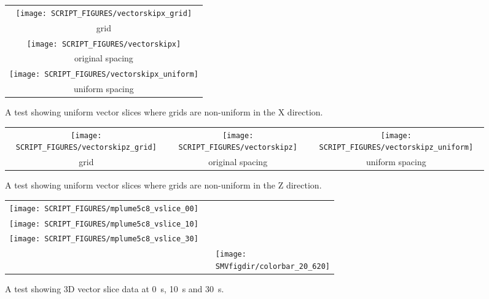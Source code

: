 \documentclass[11pt,twoside]{book}
\begin{document}
\begin{figure}[bph]
\begin{center}
\begin{tabular}{c}
 \texttt{[image: SCRIPT\_FIGURES/vectorskipx\_grid]}\\
 grid\\
 \texttt{[image: SCRIPT\_FIGURES/vectorskipx]}\\
 original spacing\\
 \texttt{[image: SCRIPT\_FIGURES/vectorskipx\_uniform]}\\
 uniform spacing
 \end{tabular}
\end{center}
 \caption[A test showing uniform vector slices where grids are non-uniform in the X direction.]
{A test showing uniform vector slices where grids are non-uniform in the X direction.}
\label{figvsliceuniformx}%
\end{figure}

\begin{figure}[bph]
\begin{center}
\begin{tabular}{ccc}
 \texttt{[image: SCRIPT\_FIGURES/vectorskipz\_grid]}&
 \texttt{[image: SCRIPT\_FIGURES/vectorskipz]}&
 \texttt{[image: SCRIPT\_FIGURES/vectorskipz\_uniform]}\\
 grid&original spacing&uniform spacing\\
 \end{tabular}
\end{center}
 \caption[A test showing uniform vector slices where grids are non-uniform in the Z direction.]
{A test showing uniform vector slices where grids are non-uniform in the Z direction.}
\label{figvsliceuniformz}%
\end{figure}

\begin{figure}[bph]
\begin{center}
\begin{tabular}{ccp{1.0in}}
 \texttt{[image: SCRIPT\_FIGURES/mplume5c8\_vslice\_00]}\\
 \texttt{[image: SCRIPT\_FIGURES/mplume5c8\_vslice\_10]}\\
 \texttt{[image: SCRIPT\_FIGURES/mplume5c8\_vslice\_30]}\\
&&\raisebox{0.5in}[0pt]{\texttt{[image: \\SMVfigdir/colorbar\_20\_620]}}\\
 \end{tabular}
\end{center}
 \caption[A test showing 3D vector slice data]{A test showing 3D vector slice data at \SI{0}{s}, \SI{10}{s} and \SI{30}{s}.}
\label{figvslice3D}%
\end{figure}
\end{document}
